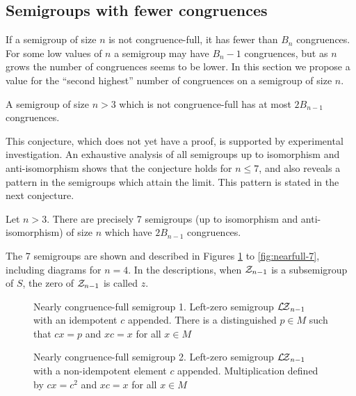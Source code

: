 \subsection{Semigroups with fewer congruences}

If a semigroup of size $n$ is not congruence-full, it has fewer than $B_n$
congruences.  For some low values of $n$ a semigroup may have $B_n - 1$
congruences, but as $n$ grows the number of congruences seems to be lower.  In
this section we propose a value for the ``second highest'' number of congruences
on a semigroup of size $n$.

\begin{conjecture}
  \label{conj:not-cong-full}
  A semigroup of size $n > 3$ which is not congruence-full has at most
  $2B_{n-1}$ congruences.
\end{conjecture}

This conjecture, which does not yet have a proof, is supported by experimental
investigation.  An exhaustive analysis of all semigroups up to isomorphism and
anti-isomorphism shows that the conjecture holds for $n \leq 7$, and also
reveals a pattern in the semigroups which attain the limit.  This pattern is
stated in the next conjecture.

\begin{conjecture}
  \label{conj:cong-nearfull-7}
  Let $n > 3$.  There are precisely 7 semigroups (up to isomorphism and
  anti-isomorphism) of size $n$ which have $2B_{n-1}$ congruences.
\end{conjecture}

The 7 semigroups are shown and described in Figures \ref{fig:nearfull-1} to
\ref{fig:nearfull-7}, including diagrams for $n = 4$.  In the descriptions,
when $\mathcal{Z}_{n-1}$ is a subsemigroup of $S$, the zero of $\mathcal{Z}_{n-1}$ is called $z$.

\begin{figure}[p]
  \centering
  
  \caption[Nearly congruence-full semigroup 1]{Nearly congruence-full semigroup
    1.  Left-zero semigroup $\mathcal{L\!Z}_{n-1}$ with an idempotent $c$ appended.  There
    is a distinguished $p \in M$ such that $cx=p$ and $xc=x$ for all $x \in M$}
  \label{fig:nearfull-1}
\end{figure}

\begin{figure}[p]
  \centering
  
  \caption[Nearly congruence-full semigroup 2]{Nearly congruence-full semigroup
    2.  Left-zero semigroup $\mathcal{L\!Z}_{n-1}$ with a non-idempotent element $c$
    appended.  Multiplication defined by $cx=c^2$ and $xc=x$ for all $x \in M$}
  \label{fig:nearfull-2}
\end{figure}

